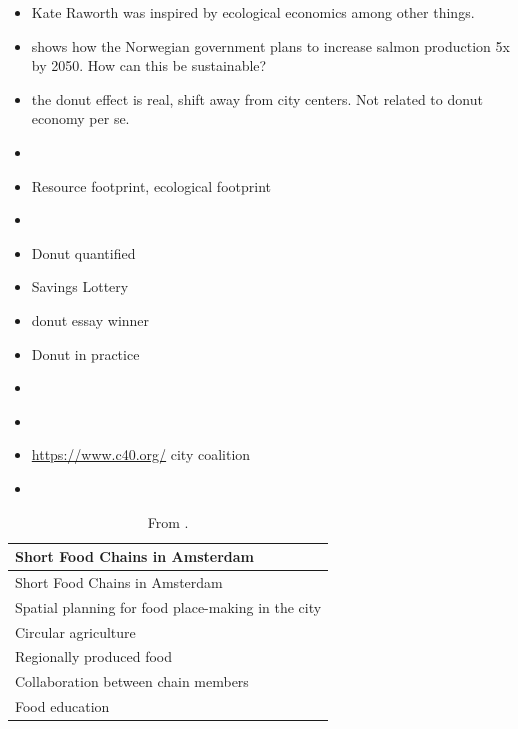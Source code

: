 \documentclass[
  letterpaper,
  DIV=11,
  numbers=noendperiod]{scrartcl}
\providecommand{\tightlist}{%
  \setlength{\itemsep}{0pt}\setlength{\parskip}{0pt}}\usepackage{longtable,booktabs,array}
\begin{document}
\begin{itemize}
\tightlist
\item
  Kate Raworth was inspired by ecological economics among other things.
\item
  \citet{baileyMappingActorsArguments2020} shows how the Norwegian
  government plans to increase salmon production 5x by 2050. How can
  this be sustainable?
\item
  \citet{gadlevanonDonutEffectReal2022} the donut effect is real, shift
  away from city centers. Not related to donut economy per se.
\item
  \citet{salaEnvironmentalSustainabilityEuropean2020}
\item
  Resource footprint, ecological footprint
\item
  \citet{oliverSafeJustOperating2022}
\item
  Donut quantified \citet{luukkanenQuantificationDoughnutEconomy2021}
\item
  \citet{defidonutPoolTogether732021} Savings Lottery
\item
  \citet{jolijnhooghwinkelVergeetGroteBedrijven2023} donut essay winner
\item
  \citet{RaworthDoughnut2021} Donut in practice
\item
  \citet{bbcreelHowDutchAre2020}
\item
  \citet{circleeconomyKeynoteIlektraKouloumpi2021}
\item
  \url{https://www.c40.org/} city coalition
\item
  \citet{goliasDonutCenteredDesign2019}
\end{itemize}

\begin{longtable}[]{@{}l@{}}
\caption{From
\citet{circleeconomyKeynoteIlektraKouloumpi2021}.}\tabularnewline
\toprule\noalign{}
Short Food Chains in Amsterdam \\
\midrule\noalign{}
\endfirsthead
\toprule\noalign{}
Short Food Chains in Amsterdam \\
\midrule\noalign{}
\endhead
\bottomrule\noalign{}
\endlastfoot
Spatial planning for food place-making in the city \\
Circular agriculture \\
Regionally produced food \\
Collaboration between chain members \\
Food education \\
\end{longtable}
\end{document}
